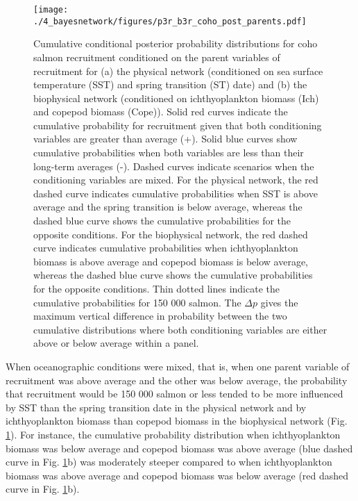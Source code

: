\begin{figure}[htbp]
  \centering \texttt{[image: ./4\_bayesnetwork/figures/p3r\_b3r\_coho\_post\_parents.pdf]}
  \caption[Cumulative conditional posterior probability distributions for coho
           salmon recruitment conditioned on the parent variables of
           recruitment.]{Cumulative conditional posterior probability
           distributions for coho salmon recruitment conditioned on the parent
           variables of recruitment for (a) the physical network (conditioned on
           sea surface temperature (SST) and spring transition (ST) date) and
           (b) the biophysical network (conditioned on ichthyoplankton biomass
           (Ich) and copepod biomass (Cope)). Solid red curves indicate
           the cumulative probability for recruitment given that both
           conditioning variables are greater than average (+). Solid
           blue curves show cumulative probabilities when both variables are
           less than their long-term averages (-). Dashed curves indicate
           scenarios when the conditioning variables are mixed. For the physical
           network, the red dashed curve indicates cumulative probabilities
           when SST is above average and the spring transition is below average,
           whereas the dashed blue curve shows the cumulative probabilities for
           the opposite conditions. For the biophysical network, the red dashed
           curve indicates cumulative probabilities when ichthyoplankton biomass
           is above average and copepod biomass is below average, whereas the
           dashed blue curve shows the cumulative probabilities for the
           opposite conditions. Thin dotted lines indicate the cumulative
           probabilities for 150 000 salmon.  The \(\Delta p\) gives the maximum
           vertical difference in probability between the two cumulative
           distributions where both conditioning variables are either above or
           below average within a panel.}
  \label{fig:bn:8}
\end{figure}

When oceanographic conditions were mixed, that is, when one parent variable of
recruitment was above average and the other was below average, the probability
that recruitment would be 150 000 salmon or less tended to be more influenced by
SST than the spring transition date in the physical network and by
ichthyoplankton biomass than copepod biomass in the biophysical network (Fig.
\ref{fig:bn:8}). For instance, the cumulative probability distribution when
ichthyoplankton biomass was below average and copepod biomass was above average
(blue dashed curve in Fig. \ref{fig:bn:8}b) was moderately steeper compared to
when ichthyoplankton biomass was above average and copepod biomass was below
average (red dashed curve in Fig. \ref{fig:bn:8}b).



